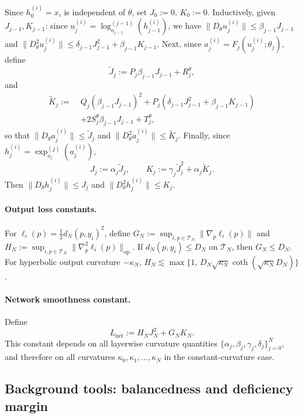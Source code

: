\documentclass[letterpaper]{article}
\begin{document}
Since \(h_0^{(i)}=x_i\) is independent of \(\theta\), set \(J_0:=0\),
\(K_0:=0\). Inductively, given \(J_{j-1}, K_{j-1}\): since
\(u_j^{(i)} = \log_{o_{j-1}}^{(j-1)}(h_{j-1}^{(i)})\), we have
\(\|D_\theta u_j^{(i)}\| \le \beta_{j-1}J_{j-1}\) and
\(\|D^2_\theta u_j^{(i)}\| \le \delta_{j-1}J_{j-1}^2+\beta_{j-1}K_{j-1}\).
Next, since \(a_j^{(i)}=F_j(u_j^{(i)};\theta_j)\), define
\[
\widetilde J_j
:=
P_j\beta_{j-1}J_{j-1}
+
R_j^\theta,
\]
and
\[
\begin{aligned}
\widetilde K_j
:=\;
& Q_j(\beta_{j-1}J_{j-1})^2
+
P_j(\delta_{j-1}J_{j-1}^2+\beta_{j-1}K_{j-1})\\
& +
2S_j^\theta\beta_{j-1}J_{j-1}
+
T_j^\theta,
\end{aligned}
\]
so that \(\|D_\theta a_j^{(i)}\| \le \widetilde J_j\) and
\(\|D^2_\theta a_j^{(i)}\| \le \widetilde K_j\).
Finally, since \(h_j^{(i)} = \exp_{o_j}^{(j)}(a_j^{(i)})\),
\begin{equation}
\label{eq:JK-recursive}
J_j := \alpha_j\widetilde J_j,
\qquad
K_j := \gamma_j\widetilde J_j^2 + \alpha_j\widetilde K_j.
\end{equation}
Then \(\|D_\theta h_j^{(i)}\|\le J_j\) and
\(\|D^2_\theta h_j^{(i)}\|\le K_j\).

\paragraph{Output loss constants.}
For \(\ell_i(p)=\frac12 d_N(p,y_i)^2\), define
$G_N := \sup_{i,p\in\mathcal T_N}\|\nabla_p \ell_i(p)\|$ and
$H_N := \sup_{i,p\in\mathcal T_N}\|\nabla_p^2 \ell_i(p)\|_{\mathrm{op}}$.
If \(d_N(p,y_i)\le D_N\) on \(\mathcal T_N\), then \(G_N\le D_N\). For
hyperbolic output curvature \(-\kappa_N\),
\(H_N \lesssim \max\{1,\, D_N\sqrt{\kappa_N}\coth(\sqrt{\kappa_N}D_N)\}\).

\paragraph{Network smoothness constant.}
Define
\begin{equation}
\label{eq:Lnet-def}
L_{\mathrm{net}}
:=
H_NJ_N^2
+
G_NK_N.
\end{equation}
This constant depends on all layerwise curvature quantities
\(\{\alpha_j,\beta_j,\gamma_j,\delta_j\}_{j=0}^N\), and therefore on all
curvatures \(\kappa_0,\kappa_1,\dots,\kappa_N\) in the constant-curvature
case.

\subsection{Background tools: balancedness and deficiency margin}
\label{sec:prelim-tools}
\end{document}
